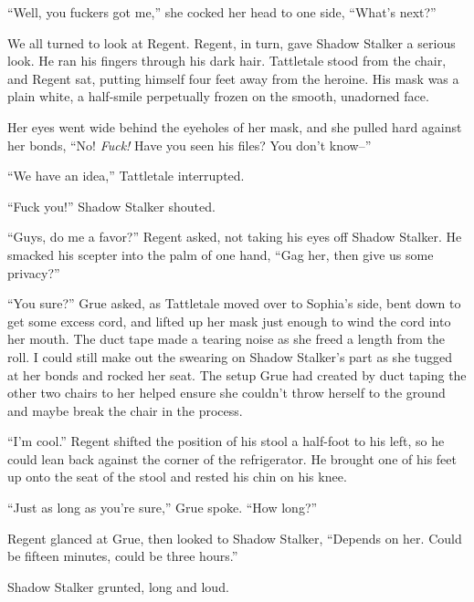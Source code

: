 ``Well, you fuckers got me,'' she cocked her head to one side, ``What's next?''



We all turned to look at Regent.  Regent, in turn, gave Shadow Stalker a serious look.  He ran his fingers through his dark hair.  Tattletale stood from the chair, and Regent sat, putting himself four feet away from the heroine.  His mask was a plain white, a half-smile perpetually frozen on the smooth, unadorned face.



Her eyes went wide behind the eyeholes of her mask, and she pulled hard against her bonds, ``No!  \emph{Fuck!}  Have you seen his files?  You don't know--''



``We have an idea,'' Tattletale interrupted.



``Fuck you!''  Shadow Stalker shouted.



``Guys, do me a favor?'' Regent asked, not taking his eyes off Shadow Stalker.  He smacked his scepter into the palm of one hand, ``Gag her, then give us some privacy?''



``You sure?'' Grue asked, as Tattletale moved over to Sophia's side, bent down to get some excess cord, and lifted up her mask just enough to wind the cord into her mouth.  The duct tape made a tearing noise as she freed a length from the roll.  I could still make out the swearing on Shadow Stalker's part as she tugged at her bonds and rocked her seat.  The setup Grue had created by duct taping the other two chairs to her helped ensure she couldn't throw herself to the ground and maybe break the chair in the process.



``I'm cool.''  Regent shifted the position of his stool a half-foot to his left, so he could lean back against the corner of the refrigerator.  He brought one of his feet up onto the seat of the stool and rested his chin on his knee.



``Just as long as you're sure,'' Grue spoke.  ``How long?''



Regent glanced at Grue, then looked to Shadow Stalker, ``Depends on her.  Could be fifteen minutes, could be three hours.''



Shadow Stalker grunted, long and loud.




